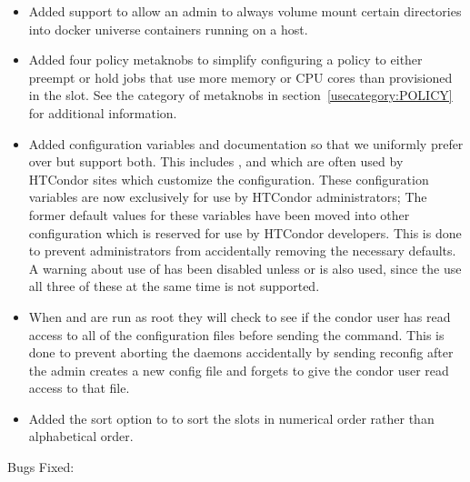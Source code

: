 \begin{itemize}

\item Added support to allow an admin to always volume mount
	certain directories into docker universe containers running
	on a host.

\item Added four policy metaknobs to simplify configuring a policy
	to either preempt or hold jobs that use more memory
	or CPU cores than provisioned in the slot. See the 
	category of metaknobs in section~\ref{usecategory:POLICY} for
	additional information.

\item Added configuration variables and documentation so that we uniformly prefer
     over  but support both. This includes
    ,  and 
    which are often used by HTCondor sites which customize the configuration. These
    configuration variables are now exclusively for use by HTCondor administrators;
    The former default values for these variables have been moved into other configuration
    which is reserved for use by HTCondor developers.  This is done to prevent administrators
    from accidentally removing the necessary defaults.
    A warning about use of  has been disabled unless
     or is also used, since
    the use all three of these at the same time is not supported.

\item When  and  are run as root
    they will check to see if the condor user has read access to all of the
    configuration files before sending the command. This is done to prevent aborting the daemons
    accidentally by sending reconfig after the admin creates a new config file and
    forgets to give the condor user read access to that file.

\item Added the  sort option to  to sort the slots
    in numerical order rather than alphabetical order.

\end{itemize}

\noindent Bugs Fixed:

